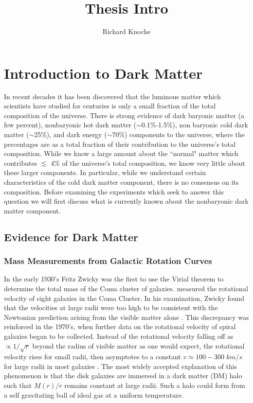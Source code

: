 \documentclass[a4paper,12pt]{article}
\begin{document}
\title{Thesis Intro}
\author{Richard Knoche}
\maketitle

\newcommand{\overbar}[1]{\mkern 1.5mu\overline{\mkern-1.5mu#1\mkern-1.5mu}\mkern 1.5mu}


\tableofcontents

\section{Introduction to Dark Matter}

In recent decades it has been discovered that the luminous matter which scientists have studied for centuries is only a small fraction of the total composition of the universe.  There is strong evidence of dark baryonic matter (a few percent), nonbaryonic hot dark matter ($\sim$0.1\%-1.5\%), non baryonic cold dark matter ($\sim$25\%), and dark energy ($\sim$70\%) components to the universe, where the percentages are as a total fraction of their contribution to the universe's total composition.  While we know a large amount about the ``normal" matter which contributes $ \lesssim $ 4\% of the universe's total composition, we know very little about these larger components.  In particular, while we understand certain characteristics of the cold dark matter component, there is no consensus on its composition.  Before examining the experiments which seek to answer this question we will first discuss what is currently known about the nonbaryonic dark matter component.

\subsection{Evidence for Dark Matter}

\subsubsection{Mass Measurements from Galactic Rotation Curves}

In the early 1930's Fritz Zwicky was the first to use the Virial theorem to determine the total mass of the Coma cluster of galaxies.   measured the rotational velocity of eight galaxies in the Coma Cluster. In his examination, Zwicky found that the velocities at large radii were too high to be consistent with the Newtonian prediction arising from the visible matter alone \cite{Zwicky}. This discrepancy was reinforced in the 1970's, when further data on the rotational velocity of spiral galaxies began to be collected.  Instead of the rotational velocity falling off as $\propto 1/\sqrt{r}$ beyond the radius of visible matter as one would expect, the rotational velocity rises for small radii, then asymptotes to a constant $ v \simeq 100-300 \; km/s $ for large radii in most galaxies \cite{Persic,Battaner,Binney}.  The most widely accepted explanation of this phenomenon is that the disk galaxies are immersed in a dark matter (DM) halo such that $ M(r)/r $ remains constant at large radii.  Such a halo could form from a self gravitating ball of ideal gas at a uniform temperature.
\end{document}
